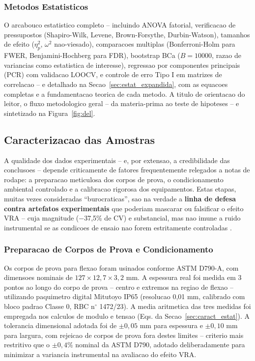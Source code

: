 \documentclass[11pt,a4paper,oneside]{article}
\begin{document}
\subsubsection{Metodos Estatisticos}

O arcabouco estatistico completo -- incluindo ANOVA fatorial, verificacao de pressupostos
(Shapiro-Wilk, Levene, Brown-Forsythe, Durbin-Watson), tamanhos de efeito ($\eta^2_p$, $\omega^2$
nao-viesado), comparacoes multiplas (Bonferroni-Holm para FWER, Benjamini-Hochberg para FDR),
bootstrap BCa ($B{=}10000$, razao de variancias como estatistica de interesse), regressao por
componentes principais (PCR) com validacao LOOCV, e controle de erro Tipo I em matrizes de
correlacao -- e detalhado na Secao~\ref{sec:estat_expandida}, com as equacoes completas e a
fundamentacao teorica de cada metodo. A titulo de orientacao do leitor, o fluxo metodologico
geral -- da materia-prima ao teste de hipoteses -- e sintetizado na Figura~\ref{fig:del}.

\subsection{Caracterizacao das Amostras}\label{sec:caract_amostras}

A qualidade dos dados experimentais -- e, por extensao, a credibilidade das conclusoes -- depende
criticamente de fatores frequentemente relegados a notas de rodape: a preparacao meticulosa dos
corpos de prova, o condicionamento ambiental controlado e a calibracao rigorosa dos equipamentos.
Estas etapas, muitas vezes consideradas ``burocraticas'', sao na verdade a {\bfseries linha de
defesa contra artefatos experimentais} que poderiam mascarar ou falsificar o efeito VRA -- cuja
magnitude ($-$37,5\% de CV) e substancial, mas nao imune a ruido instrumental se as condicoes de
ensaio nao forem estritamente controladas \cite{Montgomery2020}.

\subsubsection{Preparacao de Corpos de Prova e Condicionamento}

Os corpos de prova para flexao foram usinados conforme ASTM D790-A, com dimensoes nominais de
$127{\times}12{,}7{\times}3{,}2$ mm. A espessura real foi medida em 3 pontos ao longo do corpo
de prova -- centro e extremos na regiao de flexao -- utilizando paquimetro digital Mitutoyo IP65
(resolucao 0,01 mm, calibrado com bloco padrao Classe 0, RBC n$^{\circ}$ 1472/23). A media
aritmetica das tres medidas foi empregada nos calculos de modulo e tensao (Eqs. da
Secao~\ref{sec:caract_estat}). A tolerancia dimensional adotada foi de $\pm0{,}05$ mm para
espessura e $\pm0{,}10$ mm para largura, com rejeicao de corpos de prova fora destes limites --
criterio mais restritivo que o $\pm0{,}4\%$ nominal da ASTM D790, adotado deliberadamente para
minimizar a variancia instrumental na avaliacao do efeito VRA.
\end{document}

